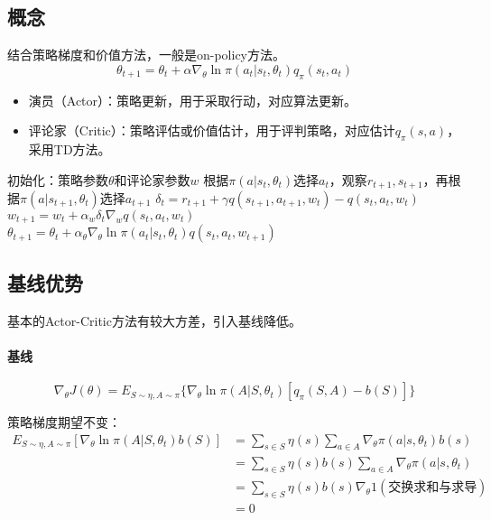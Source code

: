 \documentclass[
12pt, %
a4paper, 
oneside, %
headinclude,footinclude, %
]{scrartcl}
\begin{document}
\subsection[概念]{概念}
结合策略梯度和价值方法，一般是on-policy方法。
$$ \theta_{t + 1} = \theta_t + \alpha \nabla_\theta \ln \pi(a_t|s_t, \theta_t) q_\pi(s_t, a_t) $$
\begin{itemize}
\item 演员（Actor）：策略更新，用于采取行动，对应算法更新。
\item 评论家（Critic）：策略评估或价值估计，用于评判策略，对应估计$ q_{\pi}(s, a) $，采用TD方法。
\end{itemize}
\begin{myalgorithm}[QAC]
\State 初始化：策略参数$ \theta $和评论家参数$ w $
\State 根据$ \pi(a|s_t, \theta_t) $选择$ a_t $，观察$ r_{t + 1}, s_{t + 1} $，再根据$ \pi(a|s_{t + 1}, \theta_t) $选择$ a_{t + 1} $
\State $ \delta_t = r_{t + 1} + \gamma q(s_{t + 1}, a_{t + 1}, w_t) - q(s_t, a_t, w_t) $ 
\State $ w_{t + 1} = w_t + \alpha_w \delta_t \nabla_w q(s_t, a_t, w_t) $ 
\State $ \theta_{t + 1} = \theta_t + \alpha_\theta \nabla_\theta \ln \pi(a_t|s_t, \theta_t) q(s_t, a_t, w_{t + 1}) $ 
\EndFor
\EndFor
\end{myalgorithm}
\subsection[基线优势]{基线优势}
基本的Actor-Critic方法有较大方差，引入基线降低。
\paragraph{基线}
$$ \nabla_\theta J(\theta) = E_{S \sim \eta, A \sim \pi}\{\nabla_\theta \ln \pi(A|S, \theta_t) [q_\pi(S, A) - b(S)]\} $$

策略梯度期望不变：
\begin{align*}
E_{S\sim\eta,A\sim\pi}[\nabla_\theta\ln\pi(A|S,\theta_t)b(S)] &= \sum_{s \in S} \eta(s) \sum_{a \in A} \nabla_\theta\pi(a|s,\theta_t)b(s) \\
&= \sum_{s \in S} \eta(s) b(s) \sum_{a\in A} \nabla_\theta\pi(a|s,\theta_t) \\
&= \sum_{s \in S} \eta(s) b(s) \nabla_\theta 1 (\text{交换求和与求导}) \\
&= 0
\end{align*}
\end{document}
